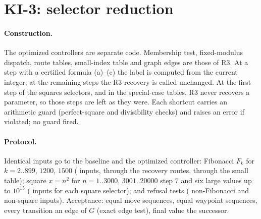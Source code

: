 \documentclass[11pt]{article}
\theoremstyle{definition}
\theoremstyle{remark}
\begin{document}
\section{KI-3: selector reduction}\label{sec:ki3}
\paragraph{Construction.} The optimized controllers are separate code. Membership test, fixed-modulus dispatch, route tables, small-index table and graph edges are those of R3. At a step with a certified formula (a)--(c) the label is computed from the current integer; at the remaining steps the R3 recovery is called unchanged. At the first step of the squares selectors, and in the special-case tables, R3 never recovers a parameter, so those steps are left as they were. Each shortcut carries an arithmetic guard (perfect-square and divisibility checks) and raises an error if violated; no guard fired.
\paragraph{Protocol.} Identical inputs go to the baseline and the optimized controller: Fibonacci $F_k$ for $k=2..899$, $1200$, $1500$ (\FibInputs{} inputs, \FibRouteInputs{} through the recovery routes, \FibSmallInputs{} through the small table); square $x=n^2$ for $n=1..3000$, $3001..20000$ step $7$ and six large values up to $10^{15}$ (\SqDInputs{} inputs for each square selector); and refusal tests (\FibRejects{} non-Fibonacci and \SqDRejects{} non-square inputs). Acceptance: equal move sequences, equal waypoint sequences, every transition an edge of $G$ (exact edge test), final value the successor.
\end{document}
